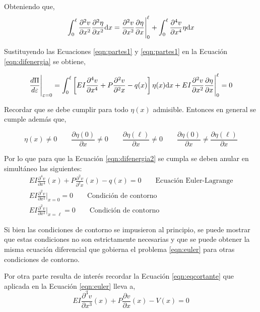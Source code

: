 Obteniendo que,
\begin{equation}\label{eqn:partes2}
\int_0^\ell \frac{\partial^2 v}{\partial x^2} \frac{\partial^2 \eta}{\partial x^2}{\text{d}} x = \frac{\partial^2 v}{\partial x^2} \frac{\partial \eta}{\partial x}\Bigg|_0^\ell + \int_0^\ell \frac{\partial^4 v}{\partial x^4} \eta {\text{d}} x
\end{equation}

Sustituyendo las Ecuaciones \eqref{eqn:partes1} y \eqref{eqn:partes1} en la Ecuación \eqref{eqn:difenergia} se obtiene,

\begin{equation}\label{eqn:difenergia2}
\frac{d\Pi}{d\varepsilon} \Bigg|_{\varepsilon=0} = \int_0^\ell \left[ EI \frac{\partial^4 v}{\partial x^4} + P \frac{\partial^2 v}{\partial^2 x} - q(x)  \right] \eta(x) {\text{d}} x + EI\frac{\partial^2 v}{\partial x^2} \frac{\partial \eta}{\partial x}\Bigg|_0^\ell = 0
\end{equation}

Recordar que se debe cumplir para todo $\eta(x)$ admisible. Entonces en general se cumple además que, 

$$
\eta(x)\neq0 
\qquad
\frac{\partial \eta(0)}{\partial x} \neq 0
\qquad
\frac{\partial \eta(\ell)}{\partial x} \neq 0
\qquad 
\frac{\partial \eta(0)}{\partial x} \neq \frac{\partial \eta(\ell)}{\partial x}
$$

Por lo que para que la Ecuación \eqref{eqn:difenergia2} se cumpla se deben anular en simultáneo las siguientes:
\begin{eqnarray}
EI \frac{\partial^4 v}{\partial x^4}(x) + P \frac{\partial^2 v}{\partial^2 x}(x) - q(x) = 0 \qquad \text{Ecuación Euler-Lagrange} \label{eqn:euler} \\
EI\frac{\partial^2 v}{\partial x^2}\Bigg|_{x=0}=0 \qquad \text{Condición de contorno} \label{eqn:contorno1} \\
EI\frac{\partial^2 v}{\partial x^2}\Bigg|_{x=\ell}=0 \qquad \text{Condición de contorno} \label{eqn:contorno2}
\end{eqnarray}

Si bien las condiciones de contorno se impusieron al principio, se puede mostrar que estas condiciones no son estrictamente necesarias y que se puede obtener la misma ecuación diferencial que gobierna el problema \eqref{eqn:euler} para otras condiciones de contorno.

Por otra parte resulta de interés recordar la Ecuación \eqref{eqn:eqcortante} que aplicada en la Ecuación \eqref{eqn:euler} lleva a,
\begin{equation}\label{eqn:condcortante}
EI \frac{\partial^3 v}{\partial x^3}(x) + P \frac{\partial v}{\partial x}(x) - V(x) = 0
\end{equation}

